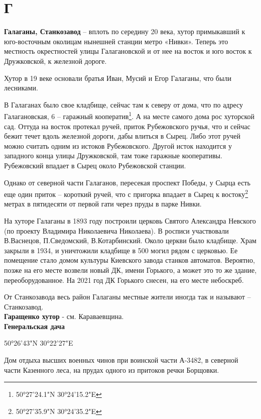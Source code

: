 \chapter*{Г}

\textbf{Галаганы, Станкозавод} – вплоть по середину 20 века, хутор примыкавший к юго-восточ\-ным околицам нынешней станции метро «Нивки». Теперь это местность окрестностей улицы Галагановской и от нее на восток и юго восток к Дружковской, к железной дороге.

Хутор в 19 веке основали братья Иван, Мусий и Егор Галаганы, что были лесниками.

В Галаганах было свое кладбище, сейчас там к северу от дома, что по адресу Галагановская, 6 – гаражный кооператив\footnote{50°27'24.1"N 30°24'15.2"E}. А на месте самого дома рос хуторской сад. Оттуда на восток протекал ручей, приток Рубежовского ручья, что  и сейчас бежит течет вдоль железной дороги, дабы влиться в Сырец. Либо этот ручей можно считать одним из истоков Рубежовского. Другой исток находится у западного конца улицы Дружковской, там тоже гаражные кооперативы. Рубежовский впадает в Сырец около Рубежовской станции.

Однако от северной части Галаганов, пересекая проспект Победы, у Сырца есть еще один приток – короткий ручей, что с пригорка впадает в Сырец к востоку\footnote{50°27'35.9"N 30°24'35.2"E} метрах в пятидесяти от первой гати через пруды в парке Нивки.

На хуторе Галаганы в 1893 году построили  церковь Святого Александра Невского (по проекту Владимира Николаевича Николаева). В росписи участвовали В.Васнецов, П.Сведомский, В.Котарбинский. Около церкви было кладбище. Храм закрыли в 1934, и уничтожили кладбище в 500 могил рядом с церковью. Ее помещение стало домом культуры Киевского завода станков автоматов. Вероятно, позже на его месте возвели новый ДК, имени Горького, а может это то же здание, переоборудованное. На 2021 год ДК Горького снесен, на его месте небоскреб.

От Станкозавода весь район Галаганы местные жители иногда так и называют – Станкозавод.\\

\textbf{Гаращенко хутор} - см. Караваевщина.\\


\textbf{Генеральская дача} 

50°26'43"N 30°22'27"E

Дом отдыха высших военных чинов при воинской части А-3482, в северной части Казенного леса, на прудах одного из притоков речки Борщовки.

